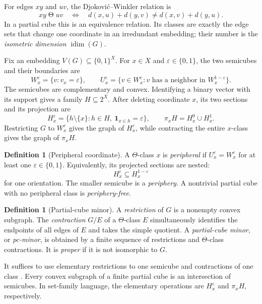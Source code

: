 \documentclass[11pt]{article}
\theoremstyle{definition}
\newtheorem{definition}[theorem]{Definition}
\theoremstyle{remark}
\newcommand{\idim}{\operatorname{idim}}
\newcommand{\eps}{\varepsilon}
\newcommand{\bits}{\{0,1\}}
\begin{document}
For edges \(xy\) and \(uv\), the Djokovi\'c--Winkler relation is
\[
 xy\mathrel\Theta uv
 \quad\Longleftrightarrow\quad
 d(x,u)+d(y,v)\ne d(x,v)+d(y,u).
\]
In a partial cube this is an equivalence relation.  Its classes are exactly
the edge sets that change one coordinate in an irredundant embedding; their
number is the \emph{isometric dimension} \(\idim(G)\).

Fix an embedding \(V(G)\subseteq\bits^X\).  For \(x\in X\) and
\(\eps\in\bits\), the two semicubes and their boundaries are
\[
 W_x^\eps=\{v:v_x=\eps\},\qquad
 U_x^\eps=\{v\in W_x^\eps:v\text{ has a neighbor in }W_x^{1-\eps}\}.
\]
The semicubes are complementary and convex.  Identifying a binary vector
with its support gives a family \(H\subseteq2^X\).  After deleting coordinate
\(x\), its two sections and its projection are
\[
 H_x^\eps=\{h\setminus\{x\}:h\in H,\ \mathbf1_{x\in h}=\eps\},
 \qquad
 \pi_xH=H_x^0\cup H_x^1.
\]
Restricting \(G\) to \(W_x^\eps\) gives the graph of \(H_x^\eps\), while
contracting the entire \(x\)-class gives the graph of \(\pi_xH\).

\begin{definition}[Peripheral coordinate]
\label{def:peripheral-coordinate}
A \(\Theta\)-class \(x\) is \emph{peripheral} if
\(U_x^\eps=W_x^\eps\) for at least one \(\eps\in\bits\).  Equivalently, its
projected sections are nested:
\[
 H_x^\eps\subseteq H_x^{1-\eps}
\]
for one orientation.  The smaller semicube is a \emph{periphery}.  A
nontrivial partial cube with no peripheral class is \emph{periphery-free}.
\end{definition}

\begin{definition}[Partial-cube minor]
\label{def:pcminor}
A \emph{restriction} of \(G\) is a nonempty convex subgraph.  The
\emph{contraction} \(G/E\) of a \(\Theta\)-class \(E\) simultaneously
identifies the endpoints of all edges of \(E\) and takes the simple quotient.
A \emph{partial-cube minor}, or \emph{pc-minor}, is obtained by a finite
sequence of restrictions and \(\Theta\)-class contractions.  It is
\emph{proper} if it is not isomorphic to \(G\).
\end{definition}

It suffices to use elementary restrictions to one semicube and contractions
of one class \cite[Section~2.1]{KnauerMarc20}.  Every convex subgraph of a
finite partial cube is an intersection of semicubes.  In set-family language,
the elementary operations are \(H_x^\eps\) and \(\pi_xH\), respectively.
\end{document}
